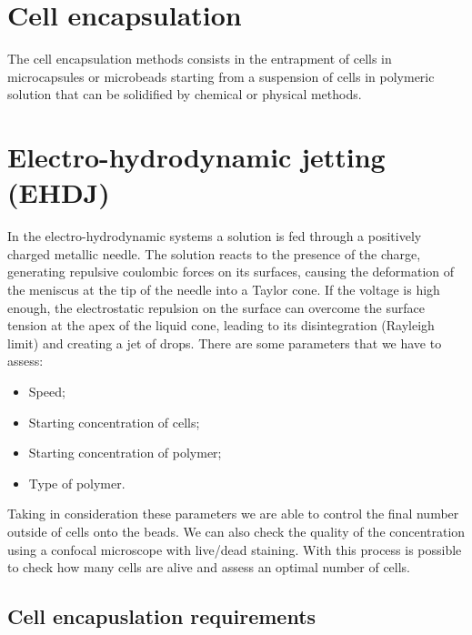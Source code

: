\section{Cell encapsulation}

The cell encapsulation methods consists in the entrapment of cells in microcapsules or microbeads starting from a suspension of cells in polymeric solution that can be solidified by chemical or physical methods. 

\section{Electro-hydrodynamic jetting (EHDJ)}

In the electro-hydrodynamic systems a solution is fed through a positively charged metallic needle. The solution reacts to the presence of the charge, generating repulsive coulombic forces on its surfaces, causing the deformation of the meniscus at the tip of the needle into a Taylor cone. If the voltage is high enough, the electrostatic repulsion on the surface can overcome the surface tension at the apex of the liquid cone, leading to its disintegration (Rayleigh limit) and creating a jet of drops.
There are some parameters that we have to assess:

\begin{multicols}{2}
    \begin{itemize}
        \item Speed;
        \item Starting concentration of cells;
        \item Starting concentration of polymer;    
        \item Type of polymer. 
    \end{itemize}
\end{multicols}

Taking in consideration these parameters we are able to control the final number outside of cells onto the beads. We can also check the quality of the concentration using a confocal microscope with live/dead staining. With this process is possible to check how many cells are alive and assess an optimal number of cells. 

    \subsection{Cell encapuslation requirements}
    
